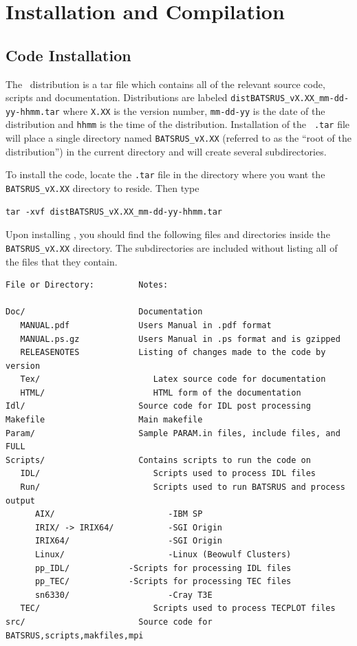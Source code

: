 \section{Installation and Compilation \label{section:install_compile}}

\subsection{Code Installation \label{section:install}}
The \BATSRUS\ distribution is a tar file which contains all of the
relevant source code, scripts and documentation.  Distributions are
labeled {\tt distBATSRUS\_vX.XX\_mm-dd-yy-hhmm.tar} where {\tt X.XX} is the
version number, {\tt mm-dd-yy} is the date of the distribution and
{\tt hhmm} is the time of the distribution.  Installation of the {\tt
.tar} file will place a single directory named {\tt BATSRUS\_vX.XX} (referred to
as the ``root of the distribution'') 
in the current directory and will create several subdirectories.

To install the code, locate the {\tt .tar} file in the directory 
where you want the {\tt BATSRUS\_vX.XX} directory to reside.  Then type
\begin{verbatim}
tar -xvf distBATSRUS_vX.XX_mm-dd-yy-hhmm.tar
\end{verbatim}

Upon installing \BATSRUS, you should find the following files
and directories inside the {\tt BATSRUS\_vX.XX} directory.  
The subdirectories are included without listing
all of the files that they contain.

\begin{verbatim}
File or Directory:         Notes:
			
Doc/                       Documentation 
   MANUAL.pdf              Users Manual in .pdf format
   MANUAL.ps.gz            Users Manual in .ps format and is gzipped
   RELEASENOTES            Listing of changes made to the code by version
   Tex/                       Latex source code for documentation
   HTML/                      HTML form of the documentation
Idl/                       Source code for IDL post processing
Makefile                   Main makefile
Param/                     Sample PARAM.in files, include files, and FULL
Scripts/                   Contains scripts to run the code on
   IDL/                       Scripts used to process IDL files
   Run/                       Scripts used to run BATSRUS and process output
      AIX/                       -IBM SP
      IRIX/ -> IRIX64/           -SGI Origin
      IRIX64/                    -SGI Origin
      Linux/                     -Linux (Beowulf Clusters)
      pp_IDL/			 -Scripts for processing IDL files
      pp_TEC/			 -Scripts for processing TEC files	
      sn6330/                    -Cray T3E
   TEC/                       Scripts used to process TECPLOT files
src/                       Source code for BATSRUS,scripts,makfiles,mpi
\end{verbatim}


